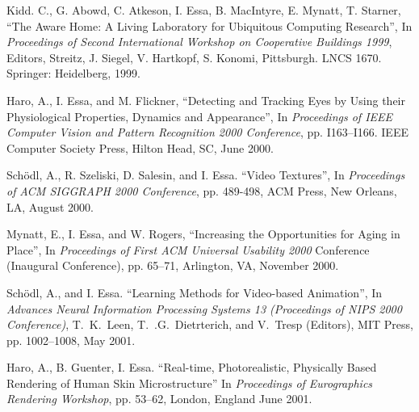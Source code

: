 \begin{pub}
\item Kidd. C., G. Abowd, C. Atkeson, I. Essa, B. MacIntyre, E. Mynatt, T.
Starner, ``The Aware Home: A Living Laboratory for Ubiquitous
Computing Research'', In \textit{Proceedings of Second
International Workshop on Cooperative Buildings 1999}, Editors,
Streitz, J. Siegel, V. Hartkopf, S. Konomi, Pittsburgh. LNCS 1670.
Springer: Heidelberg, 1999.

\item Haro, A., I. Essa, and M. Flickner,  ``Detecting and Tracking Eyes by Using
their Physiological Properties, Dynamics and Appearance'', In
\textit{Proceedings of IEEE Computer Vision and Pattern
Recognition 2000 Conference}, pp. I163--I166. IEEE Computer
Society Press, Hilton Head, SC, June 2000.  \label{pub:pupil-cvpr00}

\item Sch\"{o}dl, A., R. Szeliski, D. Salesin, and I. Essa.  ``Video Textures'', In
\textit{Proceedings of} \textit{ACM SIGGRAPH 2000 Conference}, pp.
489-498, ACM Press,  New Orleans, LA, August 2000.  \label{pub:vidtex-siggraph00}

\item Mynatt, E., I. Essa, and W. Rogers,  ``Increasing the Opportunities for Aging
in Place'', In \textit{Proceedings of} \textit{First ACM Universal
Usability 2000} Conference (Inaugural Conference), pp. 65--71,
Arlington, VA, November 2000. 

\item Sch\"{o}dl, A., and I. Essa.  ``Learning Methods for
Video-based Animation'', In \textit{Advances Neural Information
Processing Systems 13 (Proceedings of NIPS 2000 Conference)},
T.~K.~Leen, T.~.G.~Dietrterich, and V.~Tresp (Editors), MIT Press,
pp. 1002--1008, May 2001. \label{pub:vidtex-nips00} 

\item Haro, A., B. Guenter, I. Essa. ``Real-time, Photorealistic,
Physically Based Rendering of Human Skin Microstructure'' In
\textit{Proceedings of Eurographics Rendering Workshop}, pp.
53--62, London, England June 2001.\label{pub:skin-eg-render01}


\end{pub}
